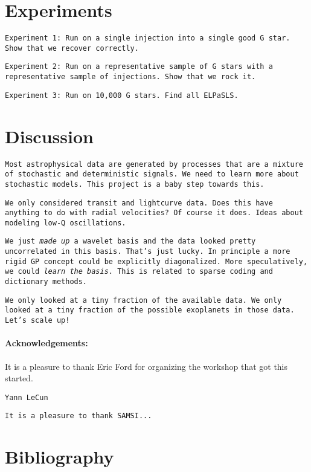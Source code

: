 \documentclass[12pt,letterpaper]{article}
\newcommand{\warning}[1]{\texttt{#1}}
\begin{document}
\section{Experiments}

\warning{Experiment 1: Run on a single injection into a single good G star.
         Show that we recover correctly.}

\warning{Experiment 2: Run on a representative sample of G stars with a representative sample of injections.
         Show that we rock it.}

\warning{Experiment 3: Run on 10,000 G stars.
         Find all ELPaSLS.}

\section{Discussion}

\warning{Most astrophysical data are generated by processes that are a mixture of
         stochastic and deterministic signals.
         We need to learn more about stochastic models.
         This project is a baby step towards this.}

\warning{We only considered transit and lightcurve data.
         Does this have anything to do with radial velocities?
         Of course it does.
         Ideas about modeling low-Q oscillations.}

\warning{We just \emph{made up} a wavelet basis and the data looked pretty uncorrelated in this basis.
         That's just lucky.
         In principle a more rigid GP concept could be explicitly diagonalized.
         More speculatively, we could \emph{learn the basis}.
         This is related to sparse coding and dictionary methods.}

\warning{We only looked at a tiny fraction of the available data.
         We only looked at a tiny fraction of the possible exoplanets in those data.
         Let's scale up!}

\paragraph{Acknowledgements:}
It is a pleasure to thank Eric Ford for organizing the workshop that got this started.

\warning{Yann LeCun}

\warning{It is a pleasure to thank SAMSI...}

\section*{Bibliography}
\end{document}
